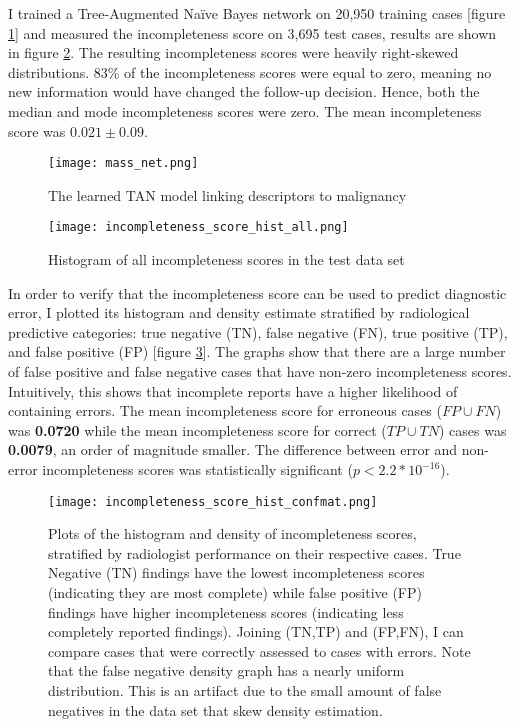 I trained a Tree-Augmented Na\"{i}ve Bayes network on 20,950 training cases [figure \ref{fig:mass_net}] and measured the incompleteness score on 3,695 test cases, results are shown in figure \ref{fig:incompleteness_score_hist_all}. The resulting incompleteness scores were heavily right-skewed distributions. 83\% of the incompleteness scores were equal to zero, meaning no new information would have changed the follow-up decision. Hence, both the median and mode incompleteness scores were zero. The mean incompleteness score was $0.021\pm0.09$.

\begin{figure}[h]
	\centering
	\texttt{[image: mass\_net.png]}
	\caption{The learned TAN model linking descriptors to malignancy}
	\label{fig:mass_net}
\end{figure}


\clearpage
\begin{figure}[h]
\centering
\texttt{[image: incompleteness\_score\_hist\_all.png]}
\caption{Histogram of all incompleteness scores in the test data set}
\label{fig:incompleteness_score_hist_all}
\end{figure}


\clearpage
In order to verify that the incompleteness score can be used to predict diagnostic error, I plotted its histogram and density estimate stratified by radiological predictive categories: true negative (TN), false negative (FN), true positive (TP), and false positive (FP) [figure \ref{fig:incompleteness_score_hist_confmat}]. The graphs show that there are a large number of false positive and false negative cases that have non-zero incompleteness scores. Intuitively, this shows that incomplete reports have a higher likelihood of containing errors. The mean incompleteness score for erroneous cases ($FP \cup FN$) was \textbf{0.0720} while the mean incompleteness score for correct ($TP \cup TN$) cases was \textbf{0.0079}, an order of magnitude smaller. The difference between error and non-error incompleteness scores was statistically significant ($p < 2.2*10^{-16}$).

\begin{figure}[h]
\centering
\texttt{[image: incompleteness\_score\_hist\_confmat.png]}
\caption[Incompleteness scores stratified by confusion matrix]{Plots of the histogram and density of incompleteness scores, stratified by radiologist performance on their respective cases. True Negative (TN) findings have the lowest incompleteness scores (indicating they are most complete) while false positive (FP) findings have higher incompleteness scores (indicating less completely reported findings). Joining (TN,TP) and (FP,FN), I can compare cases that were correctly assessed to cases with errors. Note that the false negative density graph has a nearly uniform distribution. This is an artifact due to the small amount of false negatives in the data set that skew density estimation.}
\label{fig:incompleteness_score_hist_confmat}
\end{figure}


